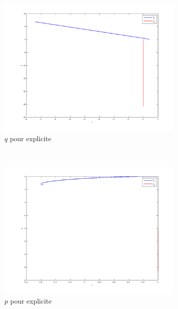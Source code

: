 \begin{figure}
  \centering
  \begin{subfigure}[b]{0.3\textwidth}
    \includegraphics[width=\textwidth]{images/Q2_explicite_q.png}
    \caption{$q$ pour explicite}
    \label{fig:q2_explicite_q}
  \end{subfigure}%
  ~ %
  \begin{subfigure}[b]{0.3\textwidth}
    \includegraphics[width=\textwidth]{images/Q2_explicite_p.png}
    \caption{$p$ pour explicite}
    \label{fig:q2_explicite_p}
  \end{subfigure}
  ~
  \begin{subfigure}[b]{0.3\textwidth}

\end{subfigure}
\end{figure}
